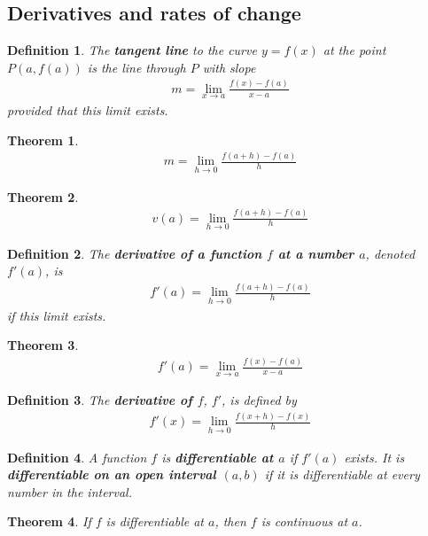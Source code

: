 \documentclass{article}
\theoremstyle{sltheorem}
\newtheorem{definition}{Definition}[section]
\newtheorem{theorem}{Theorem}[section]
\begin{document}
\subsection{Derivatives and rates of change}
\begin{definition}
    The \textbf{tangent line} to the curve $y=f(x)$ at the point $P(a, f(a))$ is the line through $P$ with slope
    \begin{align*}
        m=\lim_{x\to a}\frac{f(x)-f(a)}{x-a}
    \end{align*}
    provided that this limit exists.
\end{definition}
\begin{theorem}
    \begin{align*}
        m=\lim_{h\to 0}\frac{f(a + h)-f(a)}{h}
    \end{align*}
\end{theorem}
\begin{theorem}
    \begin{align*}
        v(a)=\lim_{h\to 0}\frac{f(a+h)-f(a)}{h}
    \end{align*}
\end{theorem}
\begin{definition}
    The \textbf{derivative of a function $f$ at a number $a$}, denoted $f'(a)$, is
    \begin{align*}
        f'(a)=\lim_{h\to 0}\frac{f(a+h)-f(a)}{h}
    \end{align*}
    if this limit exists.
\end{definition}
\begin{theorem}
    \begin{align*}
        f'(a)=\lim_{x\to a}\frac{f(x)-f(a)}{x-a}
    \end{align*}
\end{theorem}
\begin{definition}
    The \textbf{derivative of $f$}, $f'$, is defined by
    \begin{align*}
        f'(x)=\lim_{h\to 0}\frac{f(x+h)-f(x)}{h}
    \end{align*}
\end{definition}
\begin{definition}
    A function $f$ is \textbf{differentiable at $a$} if $f'(a)$ exists. It is \textbf{differentiable on an open interval $(a,b)$} if it is differentiable at every number in the interval.
\end{definition}
\begin{theorem}
    If $f$ is differentiable at $a$, then $f$ is continuous at $a$.
\end{theorem}
\end{document}

